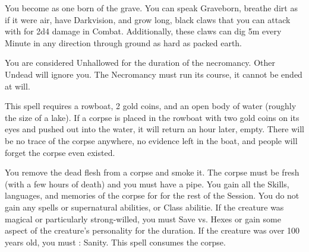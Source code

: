 {%
\newpage







\NECRO[
  Name=Born of the Grave,
  Link=necromancy-born-of-the-grave,
  Paradigm=Death,
  Save=N,
  Duration=Combat or \LVL Minutes,
  Mod=+3,
  Keywords=None,
  Target=Self
]


You become as one born of the grave.  You can speak Graveborn, breathe dirt as if it were air, have Darkvision, and grow long, black claws that you can attack with for 2d4 damage in Combat.  Additionally, these claws can dig 5m every Minute in any direction through ground as hard as packed earth.  

You are considered Unhallowed for the duration of the necromancy.  Other Undead will ignore you.  The Necromancy must run its course, it cannot be ended at will.

\cbreak

\NECRO[
  Name=Charon's Price,
  Link=necromancy-charon-price,
  Paradigm=Death,
  Save=N,
  Duration=0,
  Mod=+6,
  Keywords=None,
  Target=Corpse in a boat
]


This spell requires a rowboat, 2 gold coins, and an open body of water (roughly the size of a lake).  If a corpse is placed in the rowboat with two gold coins on its eyes and pushed out into the water, it will return an hour later, empty. There will be no trace of the corpse anywhere, no evidence left in the boat, and people will forget the corpse even existed.

\NECRO[
  Name=Corpse Smoke,
  Link=necromancy-corpse-smoke,
  Paradigm=Death,
  Save=N,
  Duration=0,
  Mod=+3,
  Keywords=None,
  Target=Close (touch) Mortal corpse
]


You remove the dead flesh from a corpse and smoke it.  The corpse must be fresh (with a few hours of death) and you must have a pipe.   You gain all the Skills, languages, and memories of the corpse for for the rest of the Session.  You do not gain any spells or supernatural abilities, or Class abilitie. If the creature was magical or particularly strong-willed, you must Save vs. Hexes or gain some aspect of the creature's personality for the duration. If the creature was over 100 years old, you must \RS : Sanity.  This spell consumes the corpse.

}
